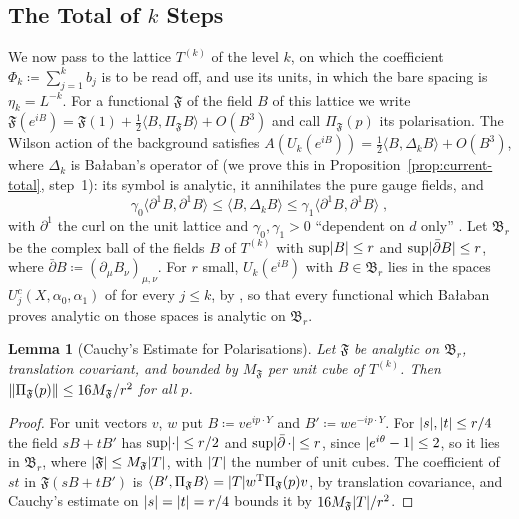 \documentclass[11pt]{preprint}
\DeclarePairedDelimiter{\abs}{\lvert}{\rvert}
\DeclarePairedDelimiter{\norm}{\lVert}{\rVert}
\numberwithin{equation}{section}
\newtheorem{lemma}{Lemma}[section]
\theoremstyle{definition}
\theoremstyle{remark}
\theoremstyle{plain}
\begin{document}
\subsection{The Total of \texorpdfstring{$k$}{k} Steps}\label{sec:k-step-total}

We now pass to the lattice $T^{(k)}$ of the level $k$, on which the coefficient $\Phi_k \coloneqq \sum_{j=1}^kb_j$ is to be read off, and use its units, in which the bare spacing is $\eta_k = L^{-k}$. For a functional $\mathfrak F$ of the field $B$ of this lattice we write $\mathfrak F(e^{iB}) = \mathfrak F(1) + \frac12\langle B, \Pi_{\mathfrak F}B \rangle + O(B^3)$ and call $\Pi_{\mathfrak F}(p)$ its polarisation. The Wilson action of the background satisfies $A(U_k(e^{iB})) = \frac12\langle B, \Delta_kB \rangle + O(B^3)$, where $\Delta_k$ is Ba{\l}aban's operator of \cite[(1.65)--(1.67), p.~29]{BalabanPRT1} (we prove this in Proposition~\ref{prop:current-total}, step~1): its symbol is analytic, it annihilates the pure gauge fields, and
\begin{equation}\label{eq:coarse-action-bounds}
    \gamma_0\langle\partial^1B, \partial^1B\rangle \leq \langle B, \Delta_kB \rangle \leq \gamma_1\langle\partial^1B, \partial^1B\rangle\;,
\end{equation}
with $\partial^1$ the curl on the unit lattice and $\gamma_0, \gamma_1 > 0$ ``dependent on $d$ only'' \cite[p.~29]{BalabanPRT1}. Let $\mathfrak B_r$ be the complex ball of the fields $B$ of $T^{(k)}$ with $\sup\abs{B} \leq r$ and $\sup\abs{\bar\partial B} \leq r$, where $\bar\partial B \coloneqq (\partial_\mu B_\nu)_{\mu,\nu}$. For $r$ small, $U_k(e^{iB})$ with $B \in \mathfrak B_r$ lies in the spaces $U^c_j(X, \alpha_0, \alpha_1)$ of \cite[(1.11)--(1.16), p.~262]{BalabanRG1} for every $j \leq k$, by \cite[Theorem~1, (181), p.~307]{BalabanVAR}, so that every functional which Ba{\l}aban proves analytic on those spaces is analytic on $\mathfrak B_r$.

\begin{lemma}[Cauchy's Estimate for Polarisations]\label{lem:cauchy-polarisation}
Let $\mathfrak F$ be analytic on $\mathfrak B_r$, translation covariant, and bounded by $M_{\mathfrak F}$ per unit cube of $T^{(k)}$. Then $\norm{\Pi_{\mathfrak F}(p)} \leq 16M_{\mathfrak F}/r^2$ for all $p$.
\end{lemma}

\begin{proof}
For unit vectors $v$, $w$ put $B \coloneqq ve^{ip\cdot Y}$ and $B' \coloneqq we^{-ip\cdot Y}$. For $\abs{s}, \abs{t} \leq r/4$ the field $sB + tB'$ has $\sup\abs{\cdot} \leq r/2$ and $\sup\abs{\bar\partial\,\cdot} \leq r$, since $\abs{e^{i\theta} - 1} \leq 2$, so it lies in $\mathfrak B_r$, where $\abs{\mathfrak F} \leq M_{\mathfrak F}\abs{T}$, with $\abs{T}$ the number of unit cubes. The coefficient of $st$ in $\mathfrak F(sB + tB')$ is $\langle B', \Pi_{\mathfrak F}B \rangle = \abs{T}w^{\mathrm T}\Pi_{\mathfrak F}(p)v$, by translation covariance, and Cauchy's estimate on $\abs{s} = \abs{t} = r/4$ bounds it by $16M_{\mathfrak F}\abs{T}/r^2$.
\end{proof}
\end{document}
